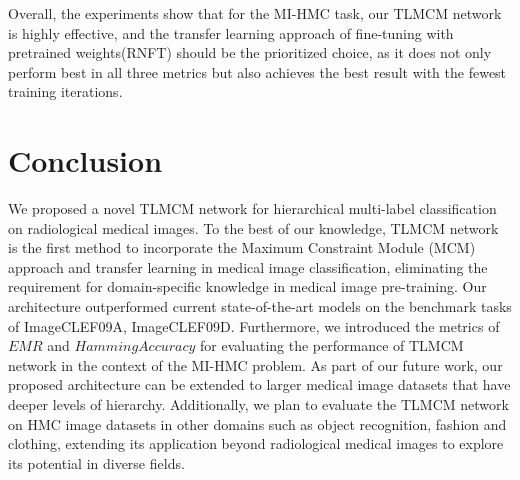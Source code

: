 \documentclass[wcp]{jmlr}
\begin{document}
Overall, the experiments show that for the MI-HMC task, our TLMCM network is highly effective, and the transfer learning approach of fine-tuning with pretrained weights(RNFT) should be the prioritized choice, as it does not only perform best in all three metrics but also achieves the best result with the fewest training iterations.

\section{Conclusion}


We proposed a novel %
TLMCM network for hierarchical multi-label classification on radiological medical images. To the best of our knowledge, TLMCM network is the first method to incorporate the Maximum Constraint Module (MCM) approach and transfer learning in medical image classification, eliminating the requirement for domain-specific knowledge in medical image pre-training. Our architecture outperformed current state-of-the-art models on the benchmark tasks of ImageCLEF09A, ImageCLEF09D. Furthermore, we introduced the metrics of $EMR$ and $Hamming Accuracy$ for evaluating the performance of TLMCM network in the context of the MI-HMC problem. %
As part of our future work, our proposed architecture can be extended to larger medical image datasets that have deeper levels of hierarchy. Additionally, we plan to evaluate the TLMCM network on HMC image datasets in other domains such as object recognition, fashion and clothing, extending its application beyond radiological medical images to explore its potential in diverse fields.

%
%
\end{document}
